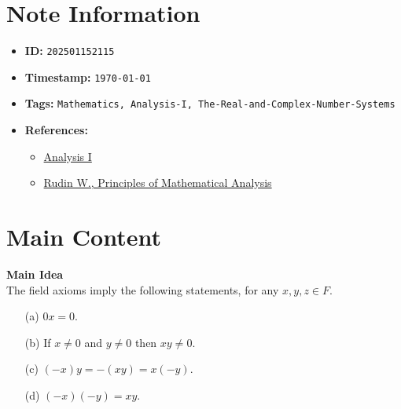 \clearpage
{}
\label{202501152115}
\renewcommand{\notetitle}{Further Implications of Field Axioms}

\section*{Note Information}
\begin{itemize}
  \item \textbf{ID:} \texttt{202501152115}
  \item \textbf{Timestamp:} \texttt{\today \ \currenttime}
  \item \textbf{Tags:} \texttt{Mathematics, Analysis-I, The-Real-and-Complex-Number-Systems}
  \item \textbf{References:}
    \begin{itemize}
      \item \href{https://ocw.mit.edu/courses/18-100b-analysis-i-fall-2010/}{Analysis I}
      \item \href{/home/garrett/Personal/References/Mathematics/Analysis-I/Rudin.pdf}{Rudin W., Principles of Mathematical Analysis}
    \end{itemize}
\end{itemize}


\section*{Main Content}
\textbf{Main Idea}\\
The field axioms imply the following statements, for any $x, y, z \in F$. 
\begin{itemize}
  \item[(a)] $0x = 0$.
  \item[(b)] If $x \neq 0$ and $y \neq 0$ then $xy \neq 0$.
  \item[(c)] $(-x)y = -(xy) = x(-y)$.
  \item[(d)] $(-x)(-y) = xy$.\\
\end{itemize}

